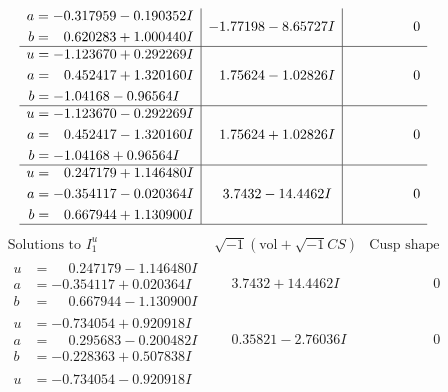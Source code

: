 \documentclass[1p]{elsarticle_modified}
\theoremstyle{definition}
\newcommand{\I}{\sqrt{-1}}
\begin{document}
$$\begin{array}{c|c|c}
\begin{aligned}
a &= -0.317959 - 0.190352 I \\
b &= \phantom{-}0.620283 + 1.000440 I\end{aligned}
 & -1.77198 - 8.65727 I & \phantom{-0.000000 } 0 \\ \hline\begin{aligned}
u &= -1.123670 + 0.292269 I \\
a &= \phantom{-}0.452417 + 1.320160 I \\
b &= -1.04168 - 0.96564 I\end{aligned}
 & \phantom{-}1.75624 - 1.02826 I & \phantom{-0.000000 } 0 \\ \hline\begin{aligned}
u &= -1.123670 - 0.292269 I \\
a &= \phantom{-}0.452417 - 1.320160 I \\
b &= -1.04168 + 0.96564 I\end{aligned}
 & \phantom{-}1.75624 + 1.02826 I & \phantom{-0.000000 } 0 \\ \hline\begin{aligned}
u &= \phantom{-}0.247179 + 1.146480 I \\
a &= -0.354117 - 0.020364 I \\
b &= \phantom{-}0.667944 + 1.130900 I\end{aligned}
 & \phantom{-}3.7432 - 14.4462 I & \phantom{-0.000000 } 0\\
 \hline 
 \end{array}$$\newpage$$\begin{array}{c|c|c}  
\text{Solutions to }I^u_{1}& \I (\text{vol} + \sqrt{-1}CS) & \text{Cusp shape}\\
 \hline 
\begin{aligned}
u &= \phantom{-}0.247179 - 1.146480 I \\
a &= -0.354117 + 0.020364 I \\
b &= \phantom{-}0.667944 - 1.130900 I\end{aligned}
 & \phantom{-}3.7432 + 14.4462 I & \phantom{-0.000000 } 0 \\ \hline\begin{aligned}
u &= -0.734054 + 0.920918 I \\
a &= \phantom{-}0.295683 - 0.200482 I \\
b &= -0.228363 + 0.507838 I\end{aligned}
 & \phantom{-}0.35821 - 2.76036 I & \phantom{-0.000000 } 0 \\ \hline\begin{aligned}
u &= -0.734054 - 0.920918 I \\

\end{aligned}
\end{array}$$
\end{document}
